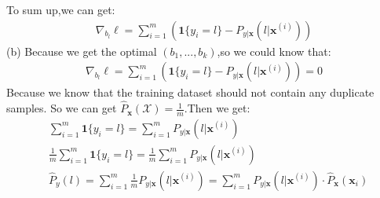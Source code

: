\documentclass[a4paper]{article}
\begin{document}
To sum up,we can get:
\begin{equation*}
\begin{aligned}
\nabla _{b_l} \ell = \sum _{i=1}^m(\mathbf{1}\{y_i=l\} - P_{y|\mathbf{x}}(l|\mathbf{x}^{(i)}))
\end{aligned}
\end{equation*}
(b) Because we get the optimal $(b_1,...,b_k)$,so we could know that:
  \begin{equation*}
\begin{aligned}
\nabla _{b_l} \ell = \sum _{i=1}^m(\mathbf{1}\{y_i=l\} - P_{y|\mathbf{x}}(l|\mathbf{x}^{(i)})) = 0
\end{aligned}
\end{equation*}
Because we know that the training dataset should not contain any duplicate samples. So we can get $\hat{P}_{\mathbf{x}}(\mathcal{X}) = \frac 1 m$.Then we get:
  \begin{equation*}
\begin{aligned}
 &\sum _{i=1}^m\mathbf{1}\{y_i=l\} = \sum_{i=1}^m P_{y|\mathbf{x}}(l|\mathbf{x}^{(i)})\\
 &\frac{1}{m} \sum _{i=1}^m\mathbf{1}\{y_i=l\}  = \frac{1}{m} \sum_{i=1}^m P_{y|\mathbf{x}}(l|\mathbf{x}^{(i)})\\
 &\hat{P}_y(l) = \sum_{i=1}^m \frac{1}{m} P_{y|\mathbf{x}}(l|\mathbf{x}^{(i)}) = \sum_{i=1}^m P_{y|\mathbf{x}}(l|\mathbf{x}^{(i)}) \cdot \hat{P}_{\mathbf{x}}(\mathbf{x}_i)
\end{aligned}
\end{equation*}
\end{document}
